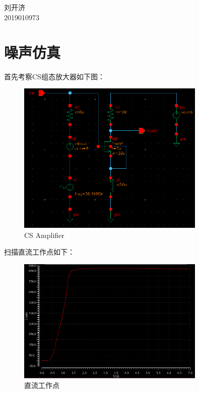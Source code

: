 \documentclass[12pt, a4paper]{article}
\begin{document}
	\begin{center}
		\vspace{0.2in}
		 \\ [12pt]
		  \\ [12pt]
		{\fontsize{14pt}{1.2em}\selectfont
			刘开济\\ [10pt]
			2019010973 \\ [10pt]
		}
	\end{center}
    \section{噪声仿真}
    首先考察CS组态放大器如下图：
        \begin{figure}[H]
    	\centering
    	\includegraphics[width = 0.8\textwidth]{CS-noise}
    	\caption{CS Amplifier}
    	\label{Fig2.1}
    \end{figure}\par
    扫描直流工作点如下：
     \begin{figure}[H]
    	\centering
    	\includegraphics[width = 0.8\textwidth]{CS-noise-DC}
    	\caption{直流工作点}
    \end{figure}\par
\end{document}
